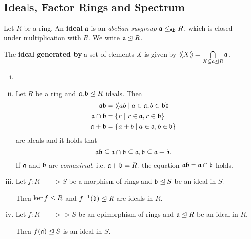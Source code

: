 	\subsection{Ideals, Factor Rings and Spectrum}
	\begin{definition}
		Let $R$ be a ring. An \textbf{ideal} $\mathfrak{a}$ is an \textit{abelian subgroup} $\mathfrak{a} \leq_{\textsf{Ab}} R$, which is closed under multiplication with $R$. We write $\mathfrak{a} \trianglelefteq R$.

		The \textbf{ideal generated by} a set of elements $X$ is given by $\langle\!\langle X \rangle\!\rangle = \bigcap \limits_{X \subseteq \mathfrak{a} \trianglelefteq R} \mathfrak{a}$.
	\end{definition}

	\begin{lemma}
		\vspace{-1.5em}\begin{enumerate}[(i)]
			\item{
				
			}
			\item{
				Let $R$ be a ring and $\mathfrak{a},\mathfrak{b} \trianglelefteq R$ ideals. Then
				\begin{align*}
					\mathfrak{ab} &= \langle\!\langle ab \mid a \in \mathfrak{a}, b \in \mathfrak{b} \rangle\!\rangle\\
					\mathfrak{a} \cap \mathfrak{b} &= \{r \mid r \in \mathfrak{a}, r \in \mathfrak{b}\}\\
					\mathfrak{a} + \mathfrak{b} &= \{a + b \mid a \in \mathfrak{a}, b \in \mathfrak{b}\}
				\end{align*}
				are ideals and it holds that 
				\begin{equation*}
					\mathfrak{ab} \subseteq \mathfrak{a} \cap \mathfrak{b} \subseteq \mathfrak{a}, \mathfrak{b} \subseteq \mathfrak{a} + \mathfrak{b}.
				\end{equation*}
				If $\mathfrak{a}$ and $\mathfrak{b}$ are \textit{comaximal}, i.e. $\mathfrak{a} + \mathfrak{b} = R$, the equation $\mathfrak{ab} = \mathfrak{a} \cap \mathfrak{b}$ holds.
			}
			\item{
				Let $f:R --> S$ be a morphism of rings and $\mathfrak{b} \trianglelefteq S$ be an ideal in $S$.

				Then $\ker f \trianglelefteq R$ and $f^{-1}(\mathfrak{b}) \trianglelefteq R$ are ideals in $R$.
			}
			\item{
				Let $f:R -->> S$ be an epimorphism of rings and $\mathfrak{a} \trianglelefteq R$ be an ideal in $R$.

				Then $f(\mathfrak{a}) \trianglelefteq S$ is an ideal in $S$.
			}
		\end{enumerate}
	\end{lemma}

